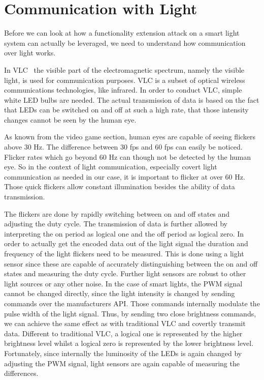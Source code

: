 \section{Communication with Light} %
\label{sec:light_communication}

Before we can look at how a functionality extension attack on a smart light system can actually be leveraged, we need to understand how communication over light works.


In VLC~\cite{Komine:2004:FAfVLCSuLL, Yu:2014:BCDRCVLOS} the visible part of the electromagnetic spectrum, namely the visible light, is used for communication purposes. VLC is a subset of optical wireless communications technologies, like infrared.
In order to conduct VLC, simple white LED bulbs are needed. The actual transmission of data is based on the fact that LEDs can be switched on and off at such a high rate, that those intensity changes cannot be seen by the human eye. %

As known from the video game section, human eyes are capable of seeing flickers above 30 Hz. The difference between 30 fps and 60 fps can easily be noticed. Flicker rates which go beyond 60 Hz can though not be detected by the human eye. So in the context of light communication, especially covert light communication as needed in our case, it is important to flicker at over 60 Hz. Those quick flickers allow constant illumination besides the ability of data transmission.

The flickers are done by rapidly switching between on and off states and adjusting the duty cycle. The transmission of data is further allowed by interpreting the on period as logical one and the off period as logical zero. In order to actually get the encoded data out of the light signal the duration and frequency of the light flickers need to be measured. This is done using a light sensor since these are capable of accurately distinguishing between the on and off states and measuring the duty cycle. Further light sensors are robust to other light sources or any other noise.
In the case of smart lights, the PWM signal cannot be changed directly, since the light intensity is changed by sending commands over the manufacturers API. Those commands internally modulate the pulse width of the light signal. Thus, by sending two close brightness commands, we can achieve the same effect as with traditional VLC and covertly transmit data. Different to traditional VLC, a logical one is represented by the higher brightness level whilst a logical zero is represented by the lower brightness level. Fortunately, since internally the luminosity of the LEDs is again changed by adjusting the PWM signal, light sensors are again capable of measuring the differences. 
